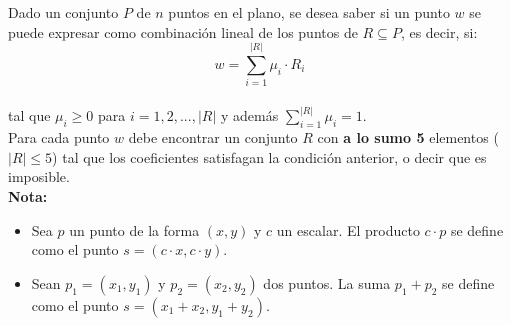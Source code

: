 %

Dado un conjunto $P$ de $n$ puntos en el plano, se desea saber si un punto $w$ se puede expresar como combinación lineal de los puntos de $R \subseteq P$, es decir, si:\\

$$w = \sum_{i=1}^{|R|} {\mu}_i \cdot R_i$$\\

tal que ${\mu}_i \ge 0$ para $i = 1,2,..., |R|$ y además $\displaystyle\sum_{i=1}^{|R|} {\mu}_i = 1 $.\\

Para cada punto $w$ debe encontrar un conjunto $R$ con \textbf{a lo sumo 5} elementos ($|R| \le 5$) tal que los coeficientes satisfagan la condición anterior, o decir que es imposible.\\

\textbf{Nota:}
\begin{itemize}
	\item Sea $p$ un punto de la forma $(x, y)$ y $c$ un escalar. El producto $c \cdot p$ se define como el punto $s = (c \cdot x, c \cdot y)$.
	\item Sean $p_1 = (x_1, y_1)$ y $p_2 = (x_2, y_2)$ dos puntos. La suma $p_1 + p_2$ se define como el punto $s = (x_1 + x_2, y_1 + y_2)$.
\end{itemize}



